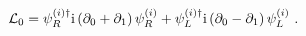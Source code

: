 \begin{equation}
{\cal L}_0 = \psi_R^{(i)\dagger} {\rm i}\left( \partial_0 + \partial_1\right) \psi_R^{(i)} +
 \psi_L^{(i)\dagger} {\rm i}\left( \partial_0 - \partial_1\right) \psi_L^{(i)} \ . 
\label{eq7p}
\end{equation}

